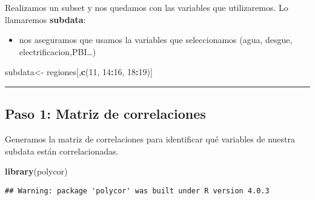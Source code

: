 \documentclass[
]{article}
\newenvironment{Shaded}{\begin{snugshade}}{\end{snugshade}}
\newcommand{\DecValTok}[1]{\textcolor[rgb]{0.00,0.00,0.81}{#1}}
\newcommand{\KeywordTok}[1]{\textcolor[rgb]{0.13,0.29,0.53}{\textbf{#1}}}
\newcommand{\NormalTok}[1]{#1}
\newcommand{\OperatorTok}[1]{\textcolor[rgb]{0.81,0.36,0.00}{\textbf{#1}}}
\newcommand{\StringTok}[1]{\textcolor[rgb]{0.31,0.60,0.02}{#1}}
\providecommand{\tightlist}{%
  \setlength{\itemsep}{0pt}\setlength{\parskip}{0pt}}
\begin{document}
Realizamos un subset y nos quedamos con las variables que utilizaremos.
Lo llamaremos \textbf{subdata}:

\begin{itemize}
\tightlist
\item
  nos aseguramos que usamos la variables que seleccionamos (agua,
  desgue, electrificacion,PBI\ldots)
\end{itemize}

\begin{Shaded}
\begin{Highlighting}[]
\NormalTok{subdata<-}\StringTok{ }\NormalTok{regiones[,}\KeywordTok{c}\NormalTok{(}\DecValTok{11}\NormalTok{, }\DecValTok{14}\OperatorTok{:}\DecValTok{16}\NormalTok{, }\DecValTok{18}\OperatorTok{:}\DecValTok{19}\NormalTok{)]}
\end{Highlighting}
\end{Shaded}

\begin{center}\rule{0.5\linewidth}{0.5pt}\end{center}

\hypertarget{paso-1-matriz-de-correlaciones}{%
\subsection{Paso 1: Matriz de
correlaciones}\label{paso-1-matriz-de-correlaciones}}

Generamos la matriz de correlaciones para identificar qué variables de
nuestra subdata están correlacionadas.

\begin{Shaded}
\begin{Highlighting}[]
\KeywordTok{library}\NormalTok{(polycor)}
\end{Highlighting}
\end{Shaded}

\begin{verbatim}
## Warning: package 'polycor' was built under R version 4.0.3
\end{verbatim}

\begin{Shaded}
\end{Shaded}
\end{document}
